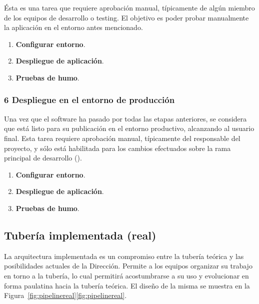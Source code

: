 Ésta es una tarea que requiere aprobación manual, típicamente de algún
miembro de los equipos de desarrollo o testing. El objetivo es poder
probar manualmente la aplicación en el entorno antes mencionado.

\begin{enumerate}
\item \textbf{Configurar entorno}.
\item \textbf{Despliegue de aplicación}.
\item \textbf{Pruebas de humo}.
\end{enumerate}
\subsubsection{6 Despliegue en el entorno de producción}

Una vez que el software ha pasado por todas las etapas anteriores, se
considera que está listo para su publicación en el entorno productivo,
alcanzando al usuario final. Esta tarea requiere aprobación manual,
típicamente del responsable del proyecto, y sólo está habilitada para
los cambios efectuados sobre la rama principal de desarrollo
().

\begin{enumerate}
\item \textbf{Configurar entorno}.
\item \textbf{Despliegue de aplicación}.
\item \textbf{Pruebas de humo}.
\end{enumerate}

\subsection{Tubería implementada (real) }

La arquitectura implementada es un compromiso entre la tubería teórica
y las posibilidades actuales de la Dirección. Permite a los equipos
organizar su trabajo en torno a la tubería, lo cual permitirá
acostumbrarse a su uso y evolucionar en forma paulatina hacia la
tubería teórica. El diseño de la misma se muestra en la
\iflatexml{}Figura~\ref{fig:pipelinereal}\else\autoref{fig:pipelinereal}\fi.
